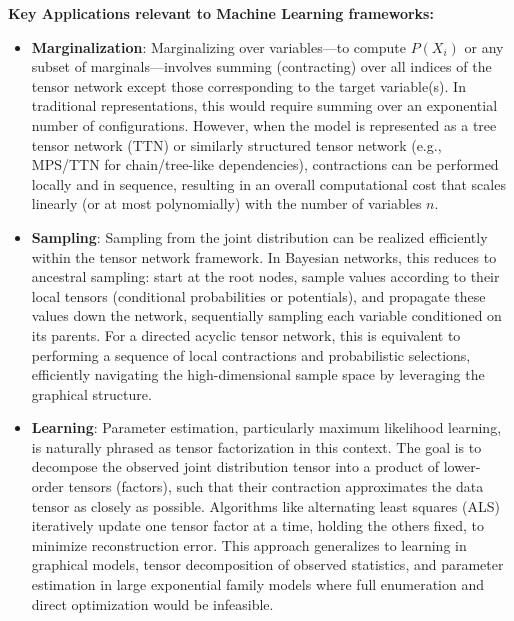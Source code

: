 \documentclass[encoding=utf8,british]{tumphthesis}
\begin{document}
            
            \textbf{Key Applications relevant to Machine Learning frameworks:}
            \begin{itemize}
                \item \textbf{Marginalization}: Marginalizing over variables—to compute $P(X_i)$ or any subset of marginals—involves summing (contracting) over all indices of the tensor 
                network except those corresponding to the target variable(s). In traditional representations, this would require summing over an exponential number of configurations. 
                However, when the model is represented as a tree tensor network (TTN) or similarly structured tensor network (e.g., MPS/TTN for chain/tree-like dependencies), 
                contractions can be performed locally and in sequence, resulting in an overall computational cost that scales linearly (or at most polynomially) with the number of variables $n$.
                \item \textbf{Sampling}: Sampling from the joint distribution can be realized efficiently within the tensor network framework. In Bayesian networks, this reduces to ancestral sampling: 
                start at the root nodes, sample values according to their local tensors (conditional probabilities or potentials), and propagate these values down the network, sequentially sampling 
                each variable conditioned on its parents. For a directed acyclic tensor network, this is equivalent to performing a sequence of local contractions and probabilistic selections, 
                efficiently navigating the high-dimensional sample space by leveraging the graphical structure.
                \item \textbf{Learning}: Parameter estimation, particularly maximum likelihood learning, is naturally phrased as tensor factorization in this context. The goal is to decompose 
                the observed joint distribution tensor into a product of lower-order tensors (factors), such that their contraction approximates the data tensor as closely as possible. Algorithms 
                like alternating least squares (ALS) iteratively update one tensor factor at a time, holding the others fixed, to minimize reconstruction error. This approach generalizes to learning 
                in graphical models, tensor decomposition of observed statistics, and parameter estimation in large exponential family models where full enumeration and direct optimization would be infeasible.
            \end{itemize}
\end{document}
